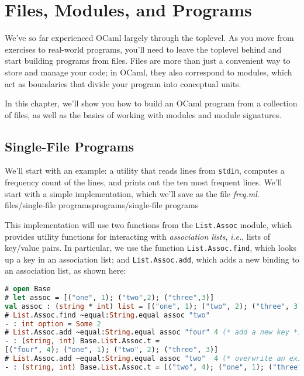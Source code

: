 \hypertarget{files-modules-and-programs}{%
\section{Files, Modules, and
Programs}\label{files-modules-and-programs}}

We've so far experienced OCaml largely through the toplevel. As you move
from exercises to real-world programs, you'll need to leave the toplevel
behind and start building programs from files. Files are more than just
a convenient way to store and manage your code; in OCaml, they also
correspond to modules, which act as boundaries that divide your program
into conceptual units.

In this chapter, we'll show you how to build an OCaml program from a
collection of files, as well as the basics of working with modules and
module signatures.

\hypertarget{single-file-programs}{%
\subsection{Single-File Programs}\label{single-file-programs}}

We'll start with an example: a utility that reads lines from
\passthrough{\lstinline!stdin!}, computes a frequency count of the
lines, and prints out the ten most frequent lines. We'll start with a
simple implementation, which we'll save as the file \emph{freq.ml}.
\protect\hypertarget{FILEsnglprog}{}{files/single-file
programs}\protect\hypertarget{Psingfil}{}{programs/single-file programs}

This implementation will use two functions from the
\passthrough{\lstinline!List.Assoc!} module, which provides utility
functions for interacting with \emph{association lists}, \emph{i.e.},
lists of key/value pairs. In particular, we use the function
\passthrough{\lstinline!List.Assoc.find!}, which looks up a key in an
association list; and \passthrough{\lstinline!List.Assoc.add!}, which
adds a new binding to an association list, as shown here:

\begin{lstlisting}[language=Caml]
# open Base
# let assoc = [("one", 1); ("two",2); ("three",3)]
val assoc : (string * int) list = [("one", 1); ("two", 2); ("three", 3)]
# List.Assoc.find ~equal:String.equal assoc "two"
- : int option = Some 2
# List.Assoc.add ~equal:String.equal assoc "four" 4 (* add a new key *)
- : (string, int) Base.List.Assoc.t =
[("four", 4); ("one", 1); ("two", 2); ("three", 3)]
# List.Assoc.add ~equal:String.equal assoc "two"  4 (* overwrite an existing key *)
- : (string, int) Base.List.Assoc.t = [("two", 4); ("one", 1); ("three", 3)]
\end{lstlisting}

